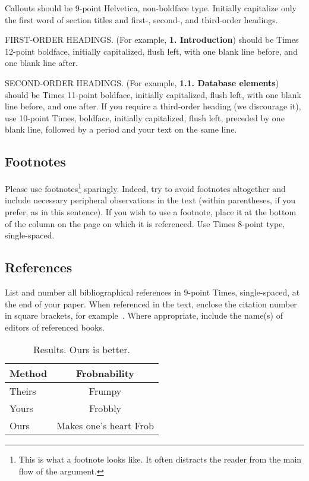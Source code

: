 \documentclass[10pt,twocolumn,letterpaper]{article}
\begin{document}
\noindent Callouts should be 9-point Helvetica, non-boldface type.
Initially capitalize only the first word of section titles and first-,
second-, and third-order headings.

FIRST-ORDER HEADINGS. (For example, {\large \bf 1. Introduction})
should be Times 12-point boldface, initially capitalized, flush left,
with one blank line before, and one blank line after.

SECOND-ORDER HEADINGS. (For example, { \bf 1.1. Database elements})
should be Times 11-point boldface, initially capitalized, flush left,
with one blank line before, and one after. If you require a third-order
heading (we discourage it), use 10-point Times, boldface, initially
capitalized, flush left, preceded by one blank line, followed by a period
and your text on the same line.

\subsection{Footnotes}

Please use footnotes\footnote {This is what a footnote looks like.  It
often distracts the reader from the main flow of the argument.} sparingly.
Indeed, try to avoid footnotes altogether and include necessary peripheral
observations in
the text (within parentheses, if you prefer, as in this sentence).  If you
wish to use a footnote, place it at the bottom of the column on the page on
which it is referenced. Use Times 8-point type, single-spaced.


\subsection{References}

List and number all bibliographical references in 9-point Times,
single-spaced, at the end of your paper. When referenced in the text,
enclose the citation number in square brackets, for
example~\cite{Authors14}.  Where appropriate, include the name(s) of
editors of referenced books.

\begin{table}
\begin{center}
\begin{tabular}{|l|c|}
\hline
Method & Frobnability \\
\hline\hline
Theirs & Frumpy \\
Yours & Frobbly \\
Ours & Makes one's heart Frob\\
\hline
\end{tabular}
\end{center}
\caption{Results. Ours is better.}
\label{mytable}
\end{table}
\end{document}
